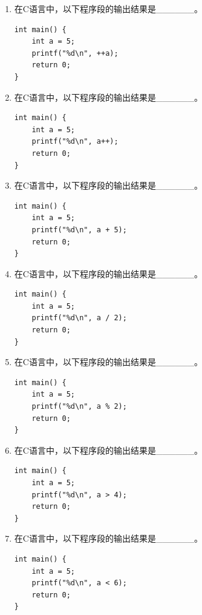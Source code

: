 \documentclass[a4paper,12pt]{article}
\begin{document}
\begin{enumerate}
	\item 在C语言中，以下程序段的输出结果是\_\_\_\_\_\_。
	      \begin{verbatim}
int main() {
    int a = 5;
    printf("%d\n", ++a);
    return 0;
}
    \end{verbatim}
	      \vspace{0.3cm}

	\item 在C语言中，以下程序段的输出结果是\_\_\_\_\_\_。
	      \begin{verbatim}
int main() {
    int a = 5;
    printf("%d\n", a++);
    return 0;
}
    \end{verbatim}
	      \vspace{0.3cm}

	\item 在C语言中，以下程序段的输出结果是\_\_\_\_\_\_。
	      \begin{verbatim}
int main() {
    int a = 5;
    printf("%d\n", a + 5);
    return 0;
}
    \end{verbatim}
	      \vspace{0.3cm}

	\item 在C语言中，以下程序段的输出结果是\_\_\_\_\_\_。
	      \begin{verbatim}
int main() {
    int a = 5;
    printf("%d\n", a / 2);
    return 0;
}
    \end{verbatim}
	      \vspace{0.3cm}

	\item 在C语言中，以下程序段的输出结果是\_\_\_\_\_\_。
	      \begin{verbatim}
int main() {
    int a = 5;
    printf("%d\n", a % 2);
    return 0;
}
    \end{verbatim}
	      \vspace{0.3cm}

	\item 在C语言中，以下程序段的输出结果是\_\_\_\_\_\_。
	      \begin{verbatim}
int main() {
    int a = 5;
    printf("%d\n", a > 4);
    return 0;
}
    \end{verbatim}
	      \vspace{0.3cm}

	\item 在C语言中，以下程序段的输出结果是\_\_\_\_\_\_。
	      \begin{verbatim}
int main() {
    int a = 5;
    printf("%d\n", a < 6);
    return 0;
}
    \end{verbatim}
	      \vspace{0.3cm}


\end{enumerate}
\end{document}
